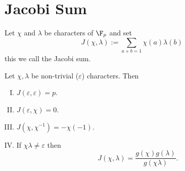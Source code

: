 \section{Jacobi Sum}

\begin{definition}
   Let \(\chi\) and \(\lambda\) be characters of \(\F_p\) and set \[J(\chi,
   \lambda) := \sum_{a + b = 1} \chi(a)\lambda(b)\] this we call the Jacobi
   sum.
\end{definition}

\begin{theorem}
   Let \(\chi, \lambda\) be non-trivial (\(\varepsilon\)) characters. Then
   \begin{enumerate}[I.]
      \item \(J(\varepsilon, \varepsilon) = p\).
      \item \(J(\varepsilon, \chi) = 0\).
      \item \(J(\chi, \chi^{-1}) = - \chi(-1)\).
      \item If  \(\chi\lambda \neq \varepsilon\) then
         \[
            J(\chi, \lambda) = \frac{g(\chi)g(\lambda)}{g(\chi\lambda)}.
         \] 
   \end{enumerate}
\end{theorem}

